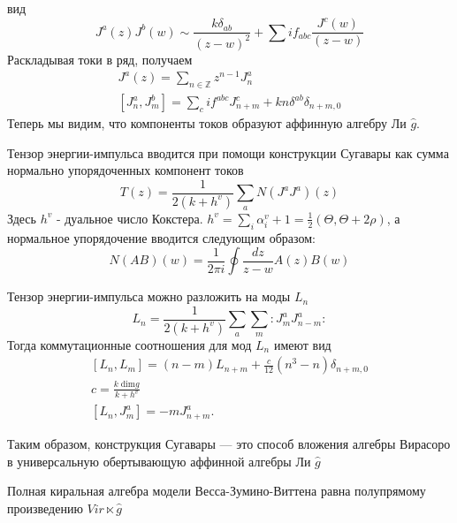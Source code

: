 \documentclass[a4paper,12pt]{article}
\theoremstyle{definition} \newtheorem{Def}{Definition}
\begin{document}
вид 
\begin{equation}
  \label{eq:89}
  J^a(z) J^b(w) \sim \frac{k\delta_{ab}}{(z-w)^2}+\sum i f_{abc}\frac{J^c(w)}{(z-w)}
\end{equation}
Раскладывая токи в ряд, получаем
\begin{equation}
  \label{eq:90}
  \begin{aligned}
    J^a(z)=\sum_{n\in \mathbb Z}z^{n-1}J^a_n\\
    \left[J^a_n,J^b_m\right]=\sum_c i f^{abc}J^c_{n+m}+kn\delta^{ab}\delta_{n+m,0}
  \end{aligned}
\end{equation}
Теперь мы видим, что компоненты токов образуют аффинную алгебру Ли $\hat g$.


Тензор энергии-импульса вводится при помощи конструкции Сугавары как сумма нормально упорядоченных компонент токов
\begin{equation}
  \label{eq:102}
  T(z)=\frac{1}{2(k+h^v)}\sum_a N(J^a J^a)(z)
\end{equation}
Здесь $h^v$ - дуальное число Кокстера. $h^v=\sum_i \alpha_i^v +1=\frac{1}{2}(\Theta,\Theta+2\rho)$,
а нормальное упорядочение вводится следующим образом: 
\begin{equation}
  \label{eq:12}
  N(AB)(w)=\frac{1}{2\pi i}\oint\frac{dz}{z-w}A(z)B(w)
\end{equation}

Тензор энергии-импульса можно разложить на моды $L_n$
\begin{equation}
  \label{eq:91}
  L_n=\frac{1}{2(k+h^v)}\sum_a\sum_m:J^a_m J^a_{n-m}:
\end{equation}
Тогда коммутационные соотношения для мод $L_n$ имеют вид
\begin{equation}
  \label{eq:92}
  \begin{aligned}
    \left[L_n,L_m\right]=(n-m)L_{n+m}+\frac{c}{12}(n^3-n)\delta_{n+m,0}\\
    c=\frac{k\;\mathrm{dim}g}{k+h^v}\\
    \left[L_n,J^a_m\right]=-mJ^a_{n+m}.
  \end{aligned}
\end{equation}

Таким образом, конструкция Сугавары --- это способ вложения алгебры Вирасоро в универсальную обертывающую аффинной алгебры Ли $\hat{g}$

Полная киральная алгебра модели Весса-Зумино-Виттена равна полупрямому произведению $Vir\ltimes \hat g$
\end{document}
